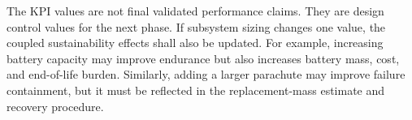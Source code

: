 The KPI values are not final validated performance claims. They are design control values for the next phase. If subsystem sizing changes one value, the coupled sustainability effects shall also be updated. For example, increasing battery capacity may improve endurance but also increases battery mass, cost, and end-of-life burden. Similarly, adding a larger parachute may improve failure containment, but it must be reflected in the replacement-mass estimate and recovery procedure.